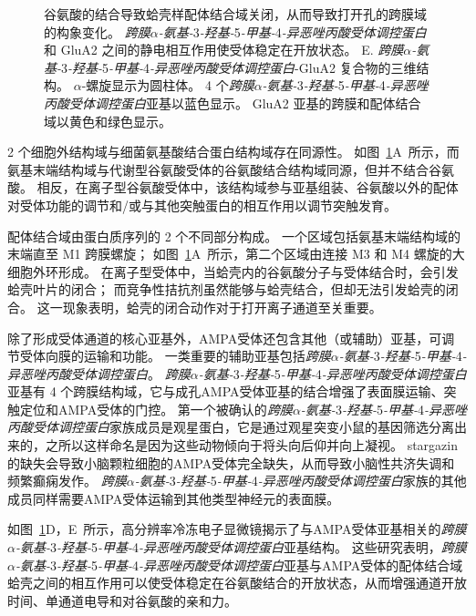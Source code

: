 \begin{figure}[htbp]
{		谷氨酸的结合导致蛤壳样配体结合域关闭，从而导致打开孔的跨膜域的构象变化。
		\textit{跨膜$\alpha$-氨基-}3\textit{-羟基-}5\textit{-甲基-}4\textit{-异恶唑丙酸受体调控蛋白}和 GluA2 之间的静电相互作用使受体稳定在开放状态\cite{mayer2016structural}。 
		E. \textit{跨膜$\alpha$-氨基-}3\textit{-羟基-}5\textit{-甲基-}4\textit{-异恶唑丙酸受体调控蛋白}-GluA2 复合物的三维结构。
		$\alpha$-螺旋显示为圆柱体。
		4 个\textit{跨膜$\alpha$-氨基-}3\textit{-羟基-}5\textit{-甲基-}4\textit{-异恶唑丙酸受体调控蛋白}亚基以蓝色显示。
		GluA2 亚基的跨膜和配体结合域以黄色和绿色显示\cite{mayer2016structural}。}
	\label{fig:13_5}
\end{figure}


2 个细胞外结构域与细菌氨基酸结合蛋白结构域存在同源性。
如图~\ref{fig:13_5}A~所示，而氨基末端结构域与代谢型谷氨酸受体的谷氨酸结合结构域同源，但并不结合谷氨酸。
相反，在离子型谷氨酸受体中，该结构域参与亚基组装、谷氨酸以外的配体对受体功能的调节和/或与其他突触蛋白的相互作用以调节突触发育。


配体结合域由蛋白质序列的 2 个不同部分构成。
一个区域包括氨基末端结构域的末端直至 M1 跨膜螺旋；
如图~\ref{fig:13_5}A~所示，第二个区域由连接 M3 和 M4 螺旋的大细胞外环形成。
在离子型受体中，当蛤壳内的谷氨酸分子与受体结合时，会引发蛤壳叶片的闭合；
而竞争性拮抗剂虽然能够与蛤壳结合，但却无法引发蛤壳的闭合。
这一现象表明，蛤壳的闭合动作对于打开离子通道至关重要。


除了形成受体通道的核心亚基外，AMPA受体还包含其他（或辅助）亚基，可调节受体向膜的运输和功能。
一类重要的辅助亚基包括\textit{跨膜$\alpha$-氨基-}3\textit{-羟基-}5\textit{-甲基-}4\textit{-异恶唑丙酸受体调控蛋白}。
\textit{跨膜$\alpha$-氨基-}3\textit{-羟基-}5\textit{-甲基-}4\textit{-异恶唑丙酸受体调控蛋白}亚基有 4 个跨膜结构域，它与成孔AMPA受体亚基的结合增强了表面膜运输、突触定位和AMPA受体的门控。
第一个被确认的\textit{跨膜$\alpha$-氨基-}3\textit{-羟基-}5\textit{-甲基-}4\textit{-异恶唑丙酸受体调控蛋白}家族成员是观星蛋白，它是通过观星突变小鼠的基因筛选分离出来的，之所以这样命名是因为这些动物倾向于将头向后仰并向上凝视。
stargazin 的缺失会导致小脑颗粒细胞的AMPA受体完全缺失，从而导致小脑性共济失调和频繁癫痫发作。
\textit{跨膜$\alpha$-氨基-}3\textit{-羟基-}5\textit{-甲基-}4\textit{-异恶唑丙酸受体调控蛋白}家族的其他成员同样需要AMPA受体运输到其他类型神经元的表面膜。


如图~\ref{fig:13_5}D，E~所示，高分辨率冷冻电子显微镜揭示了与AMPA受体亚基相关的\textit{跨膜$\alpha$-氨基-}3\textit{-羟基-}5\textit{-甲基-}4\textit{-异恶唑丙酸受体调控蛋白}亚基结构。
这些研究表明，\textit{跨膜$\alpha$-氨基-}3\textit{-羟基-}5\textit{-甲基-}4\textit{-异恶唑丙酸受体调控蛋白}亚基与AMPA受体的配体结合域蛤壳之间的相互作用可以使受体稳定在谷氨酸结合的开放状态，从而增强通道开放时间、单通道电导和对谷氨酸的亲和力。


